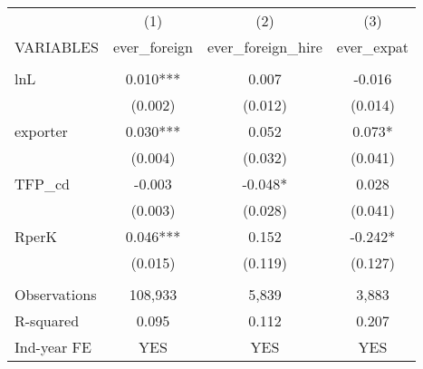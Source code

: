 \begin{tabular}{lccc} \hline
 & (1) & (2) & (3) \\
VARIABLES & ever\_foreign & ever\_foreign\_hire & ever\_expat \\ \hline
 &  &  &  \\
lnL & 0.010*** & 0.007 & -0.016 \\
 & (0.002) & (0.012) & (0.014) \\
exporter & 0.030*** & 0.052 & 0.073* \\
 & (0.004) & (0.032) & (0.041) \\
TFP\_cd & -0.003 & -0.048* & 0.028 \\
 & (0.003) & (0.028) & (0.041) \\
RperK & 0.046*** & 0.152 & -0.242* \\
 & (0.015) & (0.119) & (0.127) \\
 &  &  &  \\
Observations & 108,933 & 5,839 & 3,883 \\
R-squared & 0.095 & 0.112 & 0.207 \\
 Ind-year FE & YES & YES & YES \\ \hline
\end{tabular}

